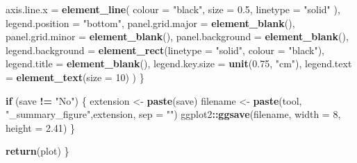 \documentclass[]{article}
\newenvironment{Shaded}{\begin{snugshade}}{\end{snugshade}}
\newcommand{\KeywordTok}[1]{\textcolor[rgb]{0.13,0.29,0.53}{\textbf{#1}}}
\newcommand{\DataTypeTok}[1]{\textcolor[rgb]{0.13,0.29,0.53}{#1}}
\newcommand{\DecValTok}[1]{\textcolor[rgb]{0.00,0.00,0.81}{#1}}
\newcommand{\FloatTok}[1]{\textcolor[rgb]{0.00,0.00,0.81}{#1}}
\newcommand{\StringTok}[1]{\textcolor[rgb]{0.31,0.60,0.02}{#1}}
\newcommand{\ControlFlowTok}[1]{\textcolor[rgb]{0.13,0.29,0.53}{\textbf{#1}}}
\newcommand{\OperatorTok}[1]{\textcolor[rgb]{0.81,0.36,0.00}{\textbf{#1}}}
\newcommand{\NormalTok}[1]{#1}
\begin{document}
\begin{Shaded}
\begin{Highlighting}[]
        \DataTypeTok{axis.line.x =} \KeywordTok{element_line}\NormalTok{(}
          \DataTypeTok{colour =} \StringTok{"black"}\NormalTok{,}
          \DataTypeTok{size =} \FloatTok{0.5}\NormalTok{,}
          \DataTypeTok{linetype =} \StringTok{"solid"}
\NormalTok{        ),}
        \DataTypeTok{legend.position =} \StringTok{"bottom"}\NormalTok{,}
        \DataTypeTok{panel.grid.major =} \KeywordTok{element_blank}\NormalTok{(),}
        \DataTypeTok{panel.grid.minor =} \KeywordTok{element_blank}\NormalTok{(),}
        \DataTypeTok{panel.background =} \KeywordTok{element_blank}\NormalTok{(),}
        \DataTypeTok{legend.background =} \KeywordTok{element_rect}\NormalTok{(}\DataTypeTok{linetype =} \StringTok{"solid"}\NormalTok{,}
                                         \DataTypeTok{colour =} \StringTok{"black"}\NormalTok{),}
        \DataTypeTok{legend.title =} \KeywordTok{element_blank}\NormalTok{(),}
        \DataTypeTok{legend.key.size =} \KeywordTok{unit}\NormalTok{(}\FloatTok{0.75}\NormalTok{, }\StringTok{"cm"}\NormalTok{),}
        \DataTypeTok{legend.text =} \KeywordTok{element_text}\NormalTok{(}\DataTypeTok{size =} \DecValTok{10}\NormalTok{)}
\NormalTok{      )}
\NormalTok{  \}}

  \ControlFlowTok{if}\NormalTok{ (save }\OperatorTok{!=}\StringTok{ "No"}\NormalTok{) \{}
\NormalTok{    extension <-}\StringTok{ }\KeywordTok{paste}\NormalTok{(save)}
\NormalTok{    filename <-}\StringTok{ }\KeywordTok{paste}\NormalTok{(tool, }\StringTok{"_summary_figure"}\NormalTok{,extension, }\DataTypeTok{sep =} \StringTok{""}\NormalTok{)}
\NormalTok{    ggplot2}\OperatorTok{::}\KeywordTok{ggsave}\NormalTok{(filename, }\DataTypeTok{width =} \DecValTok{8}\NormalTok{, }\DataTypeTok{height =} \FloatTok{2.41}\NormalTok{)}
\NormalTok{  \}}

  \KeywordTok{return}\NormalTok{(plot)}
\NormalTok{\}}
\end{Highlighting}
\end{Shaded}
\end{document}
